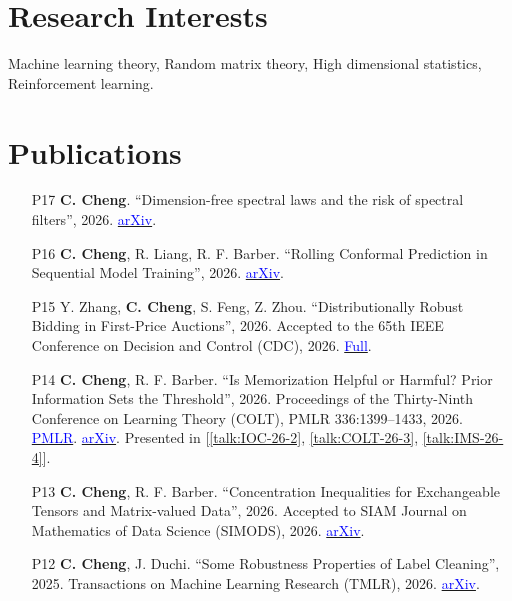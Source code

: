 \documentclass[10pt, a4paper]{article}
\makeatletter
\def\namedlabel#1#2{\begingroup
	#2%
	\def\@currentlabel{#2}%
	\phantomsection\label{#1}\endgroup
}
\makeatother
\begin{document}
\section*{\textbf{Research Interests}}
Machine learning theory, Random matrix theory, High dimensional statistics, Reinforcement learning.

\section*{\textbf{Publications}}
\begin{enumerate}
	\item[\namedlabel{pub:SpectralFilters}{P17}] \textbf{C. Cheng}. ``Dimension-free spectral laws and the risk of spectral filters'', 2026. \href{https://arxiv.org/abs/2611.21254}{\textcolor{blue}{arXiv}}.
	\item[\namedlabel{pub:RollingCP}{P16}] \textbf{C. Cheng}, R. Liang, R. F. Barber. ``Rolling Conformal Prediction in Sequential Model Training'', 2026. \href{https://arxiv.org/abs/2609.26951}{\textcolor{blue}{arXiv}}.
	\item[\namedlabel{pub:DROBidding}{P15}] Y. Zhang, \textbf{C. Cheng}, S. Feng, Z. Zhou. ``Distributionally Robust Bidding in First-Price Auctions'', 2026. Accepted to the 65th IEEE Conference on Decision and Control (CDC), 2026. \href{https://moriartycc.github.io/files/papers/distributionally-robust-bidding-first-price-auctions.pdf}{\textcolor{blue}{Full}}.
	\item[\namedlabel{pub:IsMemorizationHelpful}{P14}] \textbf{C. Cheng}, R. F. Barber. ``Is Memorization Helpful or Harmful? Prior Information Sets the Threshold'', 2026. Proceedings of the Thirty-Ninth Conference on Learning Theory (COLT), PMLR 336:1399--1433, 2026. \href{https://proceedings.mlr.press/v336/cheng26a.html}{\textcolor{blue}{PMLR}}. \href{https://arxiv.org/abs/2602.09405}{\textcolor{blue}{arXiv}}. Presented in [\ref{talk:IOC-26-2}, \ref{talk:COLT-26-3}, \ref{talk:IMS-26-4}].
	\item[\namedlabel{pub:ConcentrationTensors}{P13}] \textbf{C. Cheng}, R. F. Barber. ``Concentration Inequalities for Exchangeable Tensors and Matrix-valued Data'', 2026. Accepted to SIAM Journal on Mathematics of Data Science (SIMODS), 2026.
	\href{https://arxiv.org/abs/2601.20152}{\textcolor{blue}{arXiv}}.
	\item[\namedlabel{pub:SomeRobustness}{P12}] \textbf{C. Cheng}, J. Duchi. ``Some Robustness Properties of Label Cleaning'', 2025. Transactions on Machine Learning Research (TMLR), 2026. \href{https://arxiv.org/abs/2509.11379}{\textcolor{blue}{arXiv}}.

\end{enumerate}
\end{document}
